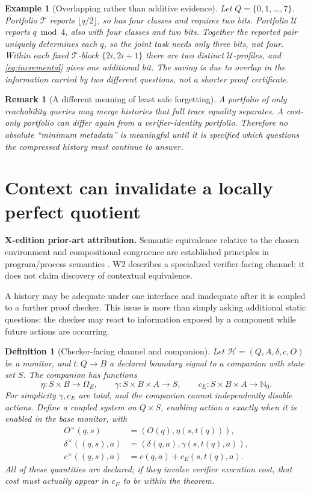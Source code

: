 \documentclass[11pt,letterpaper]{article}
\newcommand{\PriorArtNote}[1]{%
\par\smallskip\noindent\begin{minipage}{\linewidth}\small\color{black!85}%
\textbf{X-edition prior-art attribution.} #1\end{minipage}\par\smallskip}
\newtheorem{definition}[theorem]{Definition}
\newtheorem{example}[theorem]{Example}
\newtheorem{remark}[theorem]{Remark}
\newcommand{\Nzero}{\mathbb{N}_0}
\newcommand{\calT}{\mathcal{T}}
\newcommand{\calU}{\mathcal{U}}
\begin{document}
\begin{example}[Overlapping rather than additive evidence]\label{ex:overlap}
Let $Q=\{0,1,\ldots,7\}$. Portfolio $\calT$ reports $\lfloor q/2\rfloor$, so has four classes and requires two bits. Portfolio $\calU$ reports $q\bmod4$, also with four classes and two bits. Together the reported pair uniquely determines each $q$, so the joint task needs only three bits, not four. Within each fixed $\calT$-block $\{2i,2i+1\}$ there are two distinct $\calU$-profiles, and \eqref{eq:incremental} gives one additional bit. The saving is due to overlap in the information carried by two different questions, not a shorter proof certificate.
\end{example}

\begin{remark}[A different meaning of least safe forgetting]
A portfolio of \emph{only} reachability queries may merge histories that full trace equality separates. A cost-only portfolio can differ again from a verifier-identity portfolio. Therefore no absolute ``minimum metadata'' is meaningful until it is specified \emph{which questions} the compressed history must continue to answer.
\end{remark}

\section{Context can invalidate a locally perfect quotient}
\PriorArtNote{Semantic equivalence relative to the chosen environment and compositional congruence are established principles in program/process semantics \cite{scott,milner}. W2 describes a specialized verifier-facing channel; it does not claim discovery of contextual equivalence.}
A history may be adequate under one interface and inadequate after it is coupled to a further proof checker. This issue is more than simply asking additional static questions: the checker may react to information exposed by a component while future actions are occurring.

\begin{definition}[Checker-facing channel and companion]\label{def:companion}
Let $\mathcal H=(Q,A,\delta,c,O)$ be a monitor, and $t:Q\to B$ a declared \emph{boundary signal} to a companion with state set $S$. The companion has functions
\[
 \eta:S\times B\to\Omega_E,\qquad
 \gamma:S\times B\times A\to S,\qquad
 c_E:S\times B\times A\to\Nzero.
\]
For simplicity $\gamma,c_E$ are total, and the companion cannot independently disable actions. Define a coupled system on $Q\times S$, enabling action $a$ exactly when it is enabled in the base monitor, with
\begin{align*}
 O^\times(q,s)&=(O(q),\eta(s,t(q))),\\
 \delta^\times((q,s),a)&=(\delta(q,a),\gamma(s,t(q),a)),\\
 c^\times((q,s),a)&=c(q,a)+c_E(s,t(q),a).
\end{align*}
All of these quantities are declared; if they involve verifier execution cost, that cost must actually appear in $c_E$ to be within the theorem.
\end{definition}
\end{document}
